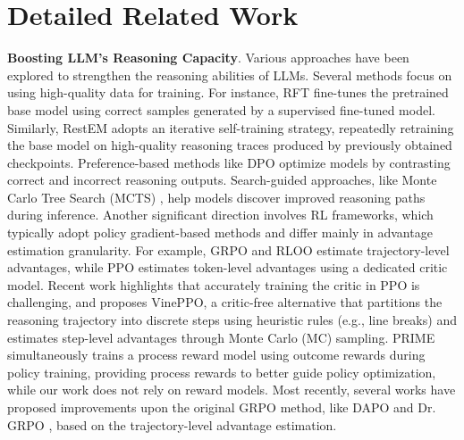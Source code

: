 \section{Detailed Related Work}
\label{appendix:more_related_work}

\textbf{Boosting LLM's Reasoning Capacity}. 
Various approaches have been explored to strengthen the reasoning abilities of LLMs. Several methods focus on using high-quality data for training. For instance, RFT \cite{yuan2024advancingllmreasoninggeneralists, yuan2023scalingrelationshiplearningmathematical} fine-tunes the pretrained base model using correct samples generated by a supervised fine-tuned model. Similarly, RestEM \cite{singh2024humandatascalingselftraining} adopts an iterative self-training strategy, repeatedly retraining the base model on high-quality reasoning traces produced by previously obtained checkpoints. Preference-based methods like DPO \cite{rafailov2024directpreferenceoptimizationlanguage,rafailov2024rqlanguagemodel} optimize models by contrasting correct and incorrect reasoning outputs. Search-guided approaches, like Monte Carlo Tree Search (MCTS) \cite{zhang2024restmctsllmselftrainingprocess, chen2024alphamathzeroprocesssupervision}, help models discover improved reasoning paths during inference. Another significant direction involves RL frameworks, which typically adopt policy gradient-based methods and differ mainly in advantage estimation granularity. For example, GRPO \cite{shao2024deepseekmathpushinglimitsmathematical} and RLOO \cite{ahmadian2024basicsrevisitingreinforcestyle} estimate trajectory-level advantages, while PPO \cite{schulman2017proximalpolicyoptimizationalgorithms, ouyang2022traininglanguagemodelsfollow} estimates token-level advantages using a dedicated critic model. Recent work \cite{kazemnejad2024vineppounlockingrlpotential} highlights that accurately training the critic in PPO is challenging, and proposes VinePPO, a critic-free alternative that partitions the reasoning trajectory into discrete steps using heuristic rules (e.g., line breaks) and estimates step-level advantages through Monte Carlo (MC) sampling. PRIME \cite{cui2025processreinforcementimplicitrewards} simultaneously trains a process reward model using outcome rewards during policy training, providing process rewards to better guide policy optimization, while our work does not rely on reward models. Most recently, several works have proposed improvements upon the original GRPO method, like DAPO \cite{yu2025dapoopensourcellmreinforcement} and Dr. GRPO \cite{liu2025understandingr1zeroliketrainingcritical}, based on the trajectory-level advantage estimation.


